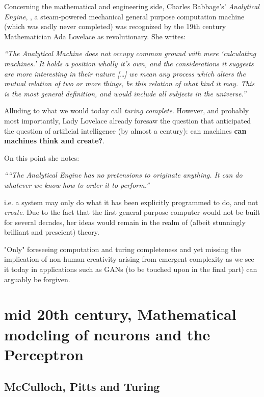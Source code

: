 Concerning the mathematical and engineering side, Charles Babbage's' \textit{Analytical Engine}, \cite{babbage}, a steam-powered mechanical general purpose computation machine (which was sadly never completed) was recognized by the 19th century Mathematician Ada Lovelace as revolutionary. She writes:

\begin{center}
	\textit{“The Analytical Machine does not occupy common ground with mere ‘calculating machines.’ It holds a position wholly it's own, and the considerations it suggests are more interesting in their nature […] we mean any process which alters the mutual relation of two or more things, be this relation of what kind it may. This is the most general definition, and would include all subjects in the universe.”}
\end{center}

\pagebreak

Alluding to what we would today call \textit{turing complete}. However, and probably most importantly, Lady Lovelace already foresaw the question that anticipated the question of artificial intelligence (by almost a century): can machines \textbf{can machines think and create?}. 

On this point she notes:

\begin{center}
	\textit{““The Analytical Engine has no pretensions to originate anything. It can do whatever we know how to order it to perform.”}
\end{center}

i.e. a system may only do what it has been explicitly programmed to do, and not \textit{create}. Due to the fact that the first general purpose computer would not be built for several decades, her ideas would remain in the realm of (albeit stunningly brilliant and prescient) theory. 

"Only" foreseeing computation and turing completeness and yet missing the implication of non-human creativity arising from emergent complexity as we see it today in applications such as \acp{GAN} (to be touched upon in the final part) can arguably be forgiven.

\pagebreak

\section{mid 20th century, Mathematical modeling of neurons and the Perceptron}

\subsection{McCulloch, Pitts and Turing}

